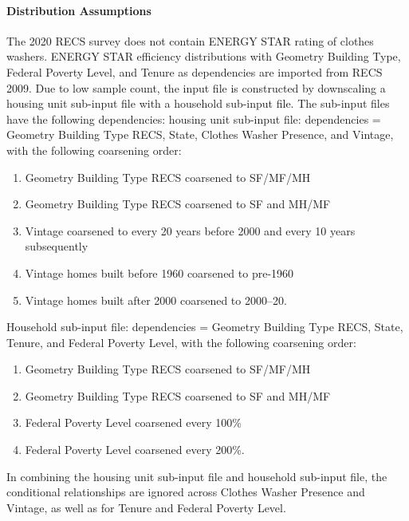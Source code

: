 \paragraph{Distribution Assumptions}
% 
The 2020 RECS survey does not contain ENERGY STAR rating of clothes washers. ENERGY STAR efficiency distributions with Geometry Building Type, Federal Poverty Level, and Tenure as dependencies are imported from RECS 2009. Due to low sample count, the input file is constructed by downscaling a housing unit sub-input file with a household sub-input file. The sub-input files have the following dependencies:
housing unit sub-input file: dependencies = Geometry Building Type RECS, State, Clothes Washer Presence, and Vintage, with the following coarsening order:
\begin{enumerate}
    \item  Geometry Building Type RECS coarsened to SF/MF/MH
    \item Geometry Building Type RECS coarsened to SF and MH/MF
    \item Vintage coarsened to every 20 years before 2000 and every 10 years subsequently
    \item Vintage homes built before 1960 coarsened to pre-1960
    \item Vintage homes built after 2000 coarsened to 2000--20.
\end{enumerate}
Household sub-input file: dependencies = Geometry Building Type RECS, State, Tenure, and Federal Poverty Level, with the following coarsening order:
\begin{enumerate}
    \item Geometry Building Type RECS coarsened to SF/MF/MH
    \item Geometry Building Type RECS coarsened to SF and MH/MF
    \item Federal Poverty Level coarsened every 100\%
    \item Federal Poverty Level coarsened every 200\%.
\end{enumerate}
In combining the housing unit sub-input file and household sub-input file, the conditional relationships are ignored across Clothes Washer Presence and Vintage, as well as for Tenure and Federal Poverty Level.
